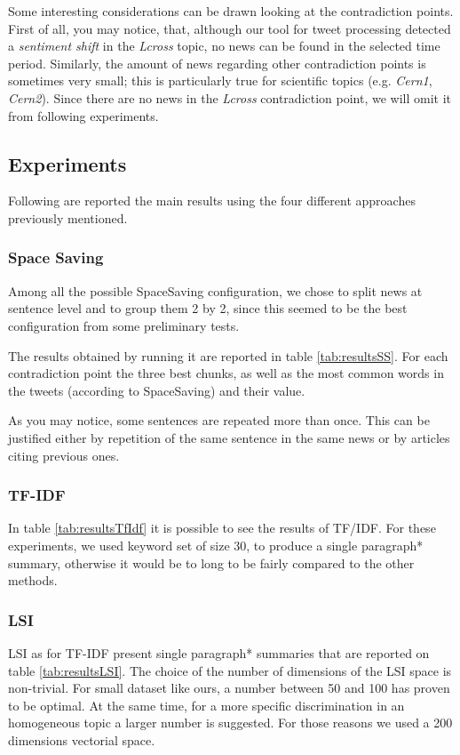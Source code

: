 Some interesting considerations can be drawn looking at the contradiction points.
First of all, you may notice, that, although our tool for tweet processing detected a \emph{sentiment
shift} in the \emph{Lcross} topic, no news can be found in the selected time period.
Similarly, the amount of news regarding other contradiction points is sometimes
very small; this is particularly true for scientific topics (e.g. \emph{Cern1},
\emph{Cern2}).
Since there are no news in the \emph{Lcross} contradiction point, we will omit it from following
experiments.

\subsection*{Experiments}
Following are reported the main results using the four different approaches previously mentioned.
\subsubsection*{Space Saving}
Among all the possible SpaceSaving configuration, we chose to split news at
sentence level and to group them 2 by 2, since this seemed to be the best
configuration from some preliminary tests.

The results obtained by running it are reported in table \ref{tab:resultsSS}. For
each contradiction point the three best chunks, as well as the most
common words in the tweets (according to SpaceSaving) and their value.

As you may notice, some sentences are repeated more than once. This can be
justified either by repetition of the same sentence in the same news or by
articles citing previous ones.

\subsubsection*{TF-IDF}
In table \ref{tab:resultsTfIdf} it is possible to see the results of TF/IDF. For these experiments, we used keyword set of size 30, to produce a single paragraph* summary, otherwise it would be to long to be fairly compared to the other methods.

\subsubsection*{LSI}
LSI as for TF-IDF present single paragraph* summaries that are reported on table \ref{tab:resultsLSI}. The choice of the number of dimensions of the LSI space is non-trivial. For small dataset like ours, a number between 50 and 100 has proven to be optimal\cite{LSA2}. At the same time, for a more specific discrimination in an homogeneous topic a larger number is suggested. For those reasons we used a 200 dimensions vectorial space.

